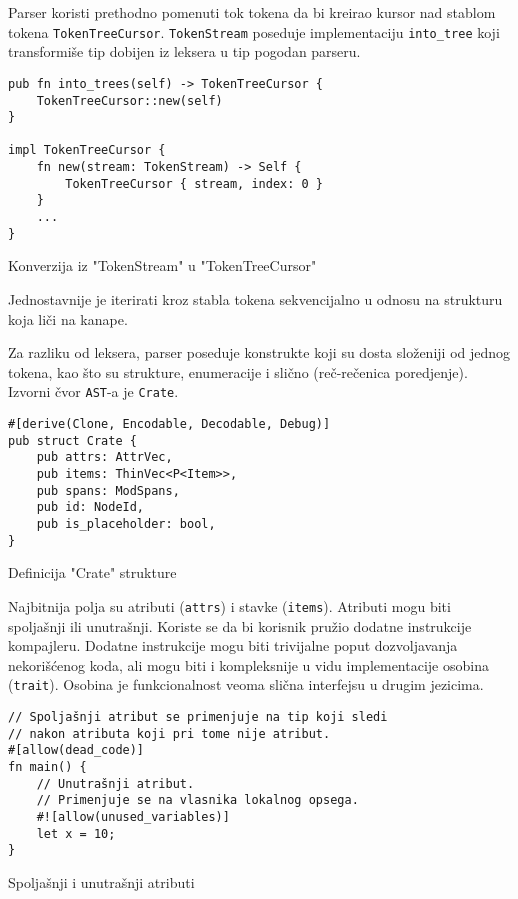 \documentclass[11pt]{article}
\begin{document}
Parser koristi prethodno pomenuti tok tokena da bi kreirao kursor nad stablom tokena \verb|TokenTreeCursor|.
\verb|TokenStream| poseduje implementaciju \verb|into_tree| koji transformiše tip dobijen iz leksera
u tip pogodan parseru.

\begin{listing}[H]
\begin{verbatim}
pub fn into_trees(self) -> TokenTreeCursor {
    TokenTreeCursor::new(self)
}

impl TokenTreeCursor {
    fn new(stream: TokenStream) -> Self {
        TokenTreeCursor { stream, index: 0 }
    }
    ...
}
\end{verbatim}
\caption{Konverzija iz "TokenStream" u "TokenTreeCursor"}
\end{listing}
Jednostavnije je iterirati kroz stabla tokena sekvencijalno u odnosu na strukturu koja liči na kanape.

Za razliku od leksera, parser poseduje konstrukte koji su dosta složeniji od jednog tokena, kao što su 
strukture, enumeracije i slično (reč-rečenica poredjenje). Izvorni čvor \verb|AST|-a je \verb|Crate|.

\begin{listing}[H]
\begin{verbatim}
#[derive(Clone, Encodable, Decodable, Debug)]
pub struct Crate {
    pub attrs: AttrVec,
    pub items: ThinVec<P<Item>>,
    pub spans: ModSpans,
    pub id: NodeId,
    pub is_placeholder: bool,
}
\end{verbatim}
\caption{Definicija "Crate" strukture}
\end{listing}

\newpage

Najbitnija polja su atributi (\verb|attrs|) i stavke (\verb|items|). Atributi mogu biti spoljašnji ili unutrašnji.
Koriste se da bi korisnik pružio dodatne instrukcije kompajleru. 
Dodatne instrukcije mogu biti trivijalne poput dozvoljavanja
nekorišćenog koda, ali mogu biti i kompleksnije u vidu implementacije osobina 
(\verb|trait|). Osobina je funkcionalnost veoma slična interfejsu u drugim jezicima. 


\begin{listing}[H]
\begin{verbatim}
// Spoljašnji atribut se primenjuje na tip koji sledi 
// nakon atributa koji pri tome nije atribut.
#[allow(dead_code)] 
fn main() {
    // Unutrašnji atribut.
    // Primenjuje se na vlasnika lokalnog opsega. 
    #![allow(unused_variables)]
    let x = 10;  
}
\end{verbatim}
\caption{Spoljašnji i unutrašnji atributi}
\end{listing}
\end{document}
